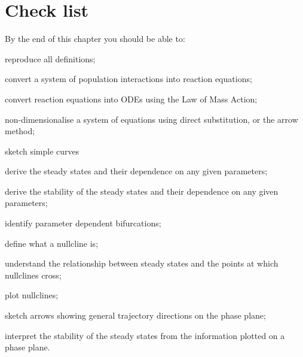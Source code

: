\section{Check list}
By the end of this chapter you should be able to:
\begin{todolist}
\item reproduce all definitions;
\item convert a system of population interactions into reaction equations;
\item convert reaction equations into ODEs using the Law of Mass Action;
\item non-dimensionalise a system of equations using direct substitution, or the arrow method;
\item sketch simple curves
\item derive the steady states and their dependence on any given parameters;
\item derive the stability of the  steady states and their dependence on any given parameters;
\item identify parameter dependent bifurcations;
\item define what a nullcline is;
\item understand the relationship between steady states and the points at which nullclines cross;
\item plot nullclines;
\item sketch arrows showing general trajectory directions on the phase plane;
\item interpret the stability of the steady states from the information plotted on a phase plane.
\end{todolist}
